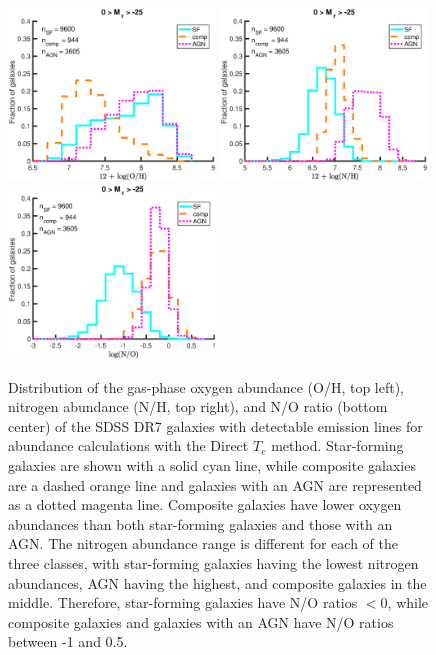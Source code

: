 \begin{figure}
    \includegraphics[width=0.49\textwidth]{Images/GV/1sig_all_BPT_t3_12logOHrelations_dust_hist}
    \includegraphics[width=0.49\textwidth]{Images/GV/1sig_all_BPT_t3_12logNHrelations_dust_hist}
    \includegraphics[width=0.49\textwidth]{Images/GV/1sig_all_BPT_t3_logNOrelations_dust_hist}
    \caption[Gas-phase chemical abundance distributions for star-forming, 
    composite, and AGN galaxies]{Distribution of the gas-phase oxygen abundance 
    (O/H, top left), nitrogen abundance (N/H, top right), and N/O ratio (bottom 
    center) of the SDSS DR7 galaxies with detectable emission lines for 
    abundance calculations with the Direct $T_e$ method.  Star-forming galaxies 
    are shown with a solid cyan line, while composite galaxies are a dashed 
    orange line and galaxies with an AGN are represented as a dotted magenta 
    line.  Composite galaxies have lower oxygen abundances than both 
    star-forming galaxies and those with an AGN.  The nitrogen abundance range 
    is different for each of the three classes, with star-forming galaxies 
    having the lowest nitrogen abundances, AGN having the highest, and 
    composite galaxies in the middle.  Therefore, star-forming galaxies have 
    N/O ratios $< 0$, while composite galaxies and galaxies with an AGN have 
    N/O ratios between -1 and 0.5.}
    \label{fig:BPT_abund}
\end{figure}

